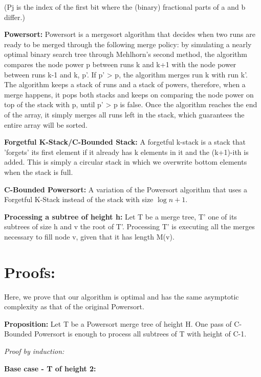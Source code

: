 \documentclass{article}
\begin{document}
(Pj is the index of the first bit where the (binary) fractional parts of a and b differ.) \cite{https://doi.org/10.4230/lipics.esa.2018.63}

\textbf{Powersort:} Powersort is a mergesort algorithm that decides when two runs are ready to be
merged through the following merge policy: by simulating a nearly optimal binary search tree through Mehlhorn's 
second method\cite{m75}, the algorithm compares the node power p between runs k and k+1 with the node power between
runs k-1 and k, p'. If p' > p, the algorithm merges run k with run k'. The algorithm keeps a stack of 
runs and a stack of powers, therefore, when a merge happens, it pops both stacks and keeps on comparing the node power on top of the stack with p, 
until p' > p is false. Once the algorithm reaches the end of the array, it simply merges all runs left in the stack, which
guarantees the entire array will be sorted. 

\textbf{Forgetful K-Stack/C-Bounded Stack:} A forgetful k-stack is a stack that 'forgets' its first element if it already has k elements
in it and the (k+1)-ith is added. This is simply a circular stack in which we overwrite bottom elements when the stack is full. 

\textbf{C-Bounded Powersort:} A variation of the Powersort algorithm that uses a Forgetful K-Stack instead of the stack with 
size $\log n + 1$. 

\textbf{Processing a subtree of height h:} Let T be a merge tree, T' one of its subtrees of size h and v the root of T'. 
Processing T' is executing all the merges necessary to fill node v, given that it has length M(v). 

\section{Proofs:} 
Here, we prove that our algorithm is optimal and has the same asymptotic complexity as that of the original Powersort.

\textbf{Proposition:} Let T be a Powersort merge tree of height H. One pass of C-Bounded Powersort is 
enough to process all subtrees of T with height of C-1.

\textit{Proof by induction:}  

\textbf{Base case - T of height 2:}

\begin{center}
\end{center}
\end{document}
